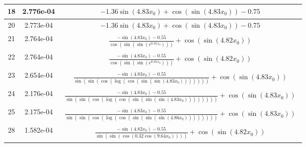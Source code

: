 \begin{center}
\begin{tabular}{|c|c|c|}
\hline18 & 2.776e-04 & $\begin{aligned}- 1.36 \sin{\left(4.83 x_{0} \right)} + \cos{\left(\sin{\left(4.83 x_{0} \right)} \right)} - 0.75\end{aligned}$\\ \hline20 & 2.773e-04 & $\begin{aligned}- 1.36 \sin{\left(4.83 x_{0} \right)} + \cos{\left(\sin{\left(4.83 x_{0} \right)} \right)} - 0.75\end{aligned}$\\ \hline21 & 2.764e-04 & $\begin{aligned}\frac{- \sin{\left(4.83 x_{0} \right)} - 0.55}{\cos{\left(\sin{\left(\sin{\left(e^{0.01 x_{0}} \right)} \right)} \right)}} + \cos{\left(\sin{\left(4.82 x_{0} \right)} \right)}\end{aligned}$\\ \hline22 & 2.764e-04 & $\begin{aligned}\frac{- \sin{\left(4.83 x_{0} \right)} - 0.55}{\cos{\left(\sin{\left(\sin{\left(e^{0.01 x_{0}} \right)} \right)} \right)}} + \cos{\left(\sin{\left(4.82 x_{0} \right)} \right)}\end{aligned}$\\ \hline23 & 2.654e-04 & $\begin{aligned}\frac{- \sin{\left(4.83 x_{0} \right)} - 0.55}{\sin{\left(\sin{\left(\cos{\left(\log{\left(\cos{\left(\sin{\left(\sin{\left(4.83 x_{0} \right)} \right)} \right)} \right)} \right)} \right)} \right)}} + \cos{\left(\sin{\left(4.83 x_{0} \right)} \right)}\end{aligned}$\\ \hline24 & 2.176e-04 & $\begin{aligned}\frac{- \sin{\left(4.83 x_{0} \right)} - 0.55}{\sin{\left(\sin{\left(\cos{\left(\log{\left(\cos{\left(\sin{\left(\sin{\left(\sin{\left(4.83 x_{0} \right)} \right)} \right)} \right)} \right)} \right)} \right)} \right)}} + \cos{\left(\sin{\left(4.83 x_{0} \right)} \right)}\end{aligned}$\\ \hline25 & 2.175e-04 & $\begin{aligned}\frac{- \sin{\left(4.83 x_{0} \right)} - 0.55}{\sin{\left(\sin{\left(\cos{\left(\log{\left(\cos{\left(\sin{\left(\sin{\left(\sin{\left(4.86 x_{0} \right)} \right)} \right)} \right)} \right)} \right)} \right)} \right)}} + \cos{\left(\sin{\left(4.83 x_{0} \right)} \right)}\end{aligned}$\\ \hline28 & 1.582e-04 & $\begin{aligned}\frac{- \sin{\left(4.82 x_{0} \right)} - 0.55}{\sin{\left(\sin{\left(\cos{\left(0.32 \cos{\left(9.64 x_{0} \right)} \right)} \right)} \right)}} + \cos{\left(\sin{\left(4.82 x_{0} \right)} \right)}\end{aligned}$\\ \hline\end{tabular}
        \end{center}
        